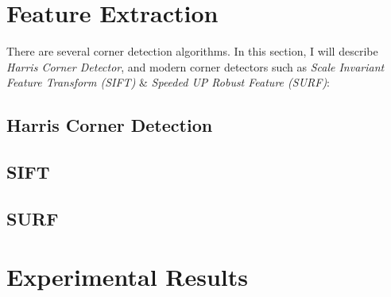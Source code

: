 \section{Feature Extraction}
\label{sec:feature-extraction}
% 
There are several corner detection algorithms. In this section, I will describe \emph{Harris Corner Detector}, and modern corner detectors such as \emph{Scale Invariant Feature Transform (SIFT)} \& \emph{Speeded UP Robust Feature (SURF)}:

\subsection{Harris Corner Detection}
\label{subsec:harris-corner-detection}


\subsection{SIFT}
\label{subsec:SIFT}

\subsection{SURF}
\label{subsec:SURF}

\newpage 
\section{Experimental Results}
\label{sec:results-feature-extraction}


